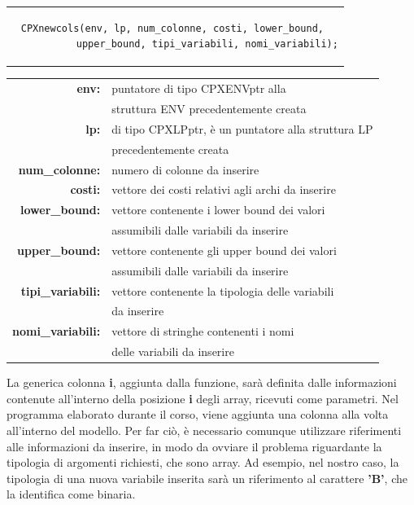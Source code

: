 \vspace{0.5cm}
\begin{center}
\begin{tabular}{c}
\begin{lstlisting}[linewidth=350pt, basicstyle=\footnotesize\sffamily,]     
CPXnewcols(env, lp, num_colonne, costi, lower_bound, 
           upper_bound, tipi_variabili, nomi_variabili);
\end{lstlisting}
\end{tabular}
\end{center}
\begin{table}[h]
\begin{tabular}{rl}
\textbf{env:} & {puntatore di tipo CPXENVptr alla}\\
& {struttura ENV precedentemente creata} \\
\textbf{lp:} & {di tipo CPXLPptr, è un puntatore alla struttura LP}\\
& {precedentemente creata}\\
\textbf{num\_colonne:} & {numero di colonne da inserire} \\    
\textbf{costi:} & {vettore dei costi relativi agli archi da inserire} \\
\textbf{lower\_bound:} & {vettore contenente i lower bound dei valori}\\
& {assumibili dalle variabili da inserire}\\              
\textbf{upper\_bound:} & {vettore contenente gli upper bound dei valori}\\
&  {assumibili dalle variabili da inserire} \\
\textbf{tipi\_variabili:} & {vettore contenente la tipologia delle variabili}\\
& da inserire\\
\textbf{nomi\_variabili:} & {vettore di stringhe contenenti i nomi}\\
& {delle variabili da inserire}
\end{tabular}
\end{table}
La generica colonna \textbf{i}, aggiunta dalla funzione, sarà definita dalle informazioni contenute all'interno della posizione \textbf{i} degli array, ricevuti come parametri. Nel programma elaborato durante il corso, viene aggiunta una colonna alla volta all'interno del modello. Per far ciò, è necessario comunque utilizzare riferimenti alle informazioni da inserire, in modo da ovviare il problema riguardante la tipologia di argomenti richiesti, che sono array. Ad esempio, nel nostro caso, la tipologia di una nuova variabile inserita sarà un riferimento al carattere \textbf{'B'}, che la identifica come binaria.\\
